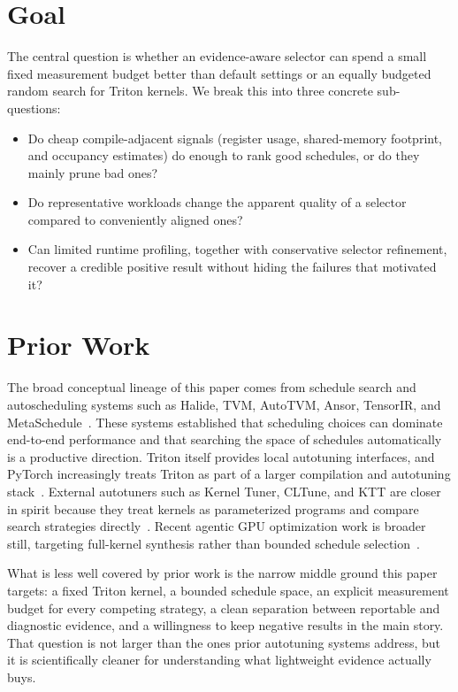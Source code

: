 \documentclass[10pt,twocolumn]{article}
\begin{document}
\section{Goal}

The central question is whether an evidence-aware selector can spend a small fixed measurement budget better than default settings or an equally budgeted random search for Triton kernels. We break this into three concrete sub-questions:
\begin{itemize}
\item Do cheap compile-adjacent signals (register usage, shared-memory footprint, and occupancy estimates) do enough to rank good schedules, or do they mainly prune bad ones?
\item Do representative workloads change the apparent quality of a selector compared to conveniently aligned ones?
\item Can limited runtime profiling, together with conservative selector refinement, recover a credible positive result without hiding the failures that motivated it?
\end{itemize}

\section{Prior Work}

The broad conceptual lineage of this paper comes from schedule search and autoscheduling systems such as Halide, TVM, AutoTVM, Ansor, TensorIR, and MetaSchedule~\citep{ragankelley2012halide,mullapudi2016halide,adams2019halide,chen2018tvm,chen2018learningtensor,zheng2020ansor,zheng2022tensorir,shao2022metaschedule}. These systems established that scheduling choices can dominate end-to-end performance and that searching the space of schedules automatically is a productive direction. Triton itself provides local autotuning interfaces, and PyTorch increasingly treats Triton as part of a larger compilation and autotuning stack~\citep{tritondocsautotune,tritondocsheuristics,pytorchcompile2026,pytorchtriton2026}. External autotuners such as Kernel Tuner, CLTune, and KTT are closer in spirit because they treat kernels as parameterized programs and compare search strategies directly~\citep{vanwerkhoven2019kerneltuner,nugteren2015cltune,petrov2023ktt}. Recent agentic GPU optimization work is broader still, targeting full-kernel synthesis rather than bounded schedule selection~\citep{dai2026cudaagent}.

What is less well covered by prior work is the narrow middle ground this paper targets: a fixed Triton kernel, a bounded schedule space, an explicit measurement budget for every competing strategy, a clean separation between reportable and diagnostic evidence, and a willingness to keep negative results in the main story. That question is not larger than the ones prior autotuning systems address, but it is scientifically cleaner for understanding what lightweight evidence actually buys.
\end{document}
